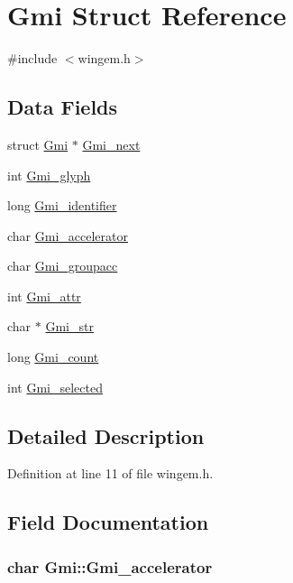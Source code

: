 \hypertarget{structGmi}{\section{Gmi Struct Reference}
\label{structGmi}
}


{\ttfamily \#include $<$wingem.\+h$>$}

\subsection*{Data Fields}
\begin{DoxyCompactItemize}
\item 
struct \hyperlink{structGmi}{Gmi} $\ast$ \hyperlink{structGmi_affa3a2ea15b9eafd09f47af267457215}{Gmi\+\_\+next}
\item 
int \hyperlink{structGmi_a567ab60c9c47bce3b99f804cb539e745}{Gmi\+\_\+glyph}
\item 
long \hyperlink{structGmi_a5519570e9de14161d2a277a72e8871b2}{Gmi\+\_\+identifier}
\item 
char \hyperlink{structGmi_ad4206d27332cf4d2bae39105fec33e29}{Gmi\+\_\+accelerator}
\item 
char \hyperlink{structGmi_a66db31adc63094c678299855b62b245f}{Gmi\+\_\+groupacc}
\item 
int \hyperlink{structGmi_a630141d7acc3e1b08fe64024b7d1fd0e}{Gmi\+\_\+attr}
\item 
char $\ast$ \hyperlink{structGmi_a85ef1b8a2f2bb42a78fa3d6a53dddfcb}{Gmi\+\_\+str}
\item 
long \hyperlink{structGmi_aa3b75743e1b8592831b42e7df93561f1}{Gmi\+\_\+count}
\item 
int \hyperlink{structGmi_a0c4ac4c267412c4d0a387a396ed019f0}{Gmi\+\_\+selected}
\end{DoxyCompactItemize}


\subsection{Detailed Description}


Definition at line 11 of file wingem.\+h.



\subsection{Field Documentation}
\hypertarget{structGmi_ad4206d27332cf4d2bae39105fec33e29}{
\subsubsection[{Gmi\+\_\+accelerator}]{\setlength{\rightskip}{0pt plus 5cm}char Gmi\+::\+Gmi\+\_\+accelerator}}\label{structGmi_ad4206d27332cf4d2bae39105fec33e29}


